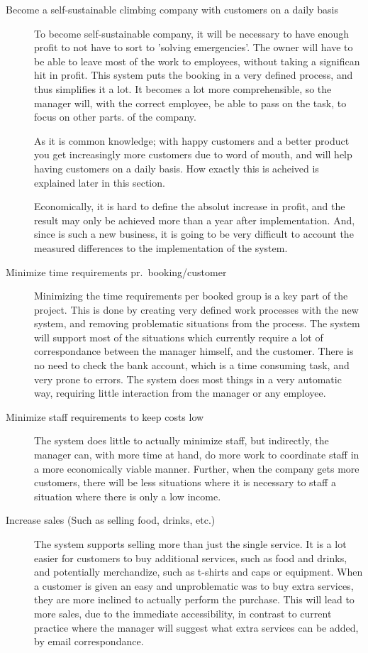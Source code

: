 \begin{description}
\item[Become a self-sustainable climbing company with customers on a daily basis]
To become self-sustainable company, it will be necessary to have enough profit
to not have to sort to 'solving emergencies'. The owner will have to be able 
to leave most of the work to employees, without taking a significan hit in 
profit. This system puts the booking in a very defined process, and thus 
simplifies it a lot. It becomes a lot more comprehensible, so the manager will,
with the correct employee, be able to pass on the task, to focus on other parts.
of the company.

As it is common knowledge; with happy customers and a better product
you get increasingly more customers due to word of mouth, and will help having 
customers on a daily basis. How exactly this is acheived is explained later in this 
section.

Economically, it is hard to define the absolut increase in profit, and the 
result may only be achieved more than a year after implementation. And, since 
\gomonkey is such a new business, it is going to be very difficult to account
the measured differences to the implementation of the system.

\item[Minimize time requirements pr.\ booking/customer]
Minimizing the time requirements per booked group is a key part of the project.
This is done by creating very defined work processes with the new system, and
removing problematic situations from the process. The system will support most
of the situations which currently require a lot of correspondance between the 
manager himself, and the customer. There is no need to check the bank account,
which is a time consuming task, and very prone to errors. The system does most
things in a very automatic way, requiring little interaction from the manager
or any employee.

\item[Minimize staff requirements to keep costs low]
The system does little to actually minimize staff, but indirectly, the manager
can, with more time at hand, do more work to coordinate staff in a more 
economically viable manner. Further, when the company gets more customers,
there will be less situations where it is necessary to staff a situation where
there is only a low income.

\item[Increase sales (Such as selling food, drinks, etc.)]
The system supports selling more than just the single service. It is a lot
easier for customers to buy additional services, such as food and drinks,
and potentially merchandize, such as t-shirts and caps or equipment. When a 
customer is given an easy and unproblematic was to buy extra services,
they are more inclined to actually perform the purchase. This will lead to
more sales, due to the immediate accessibility, in contrast to current practice
where the manager will suggest what extra services can be added, by email 
correspondance.


\end{description}
